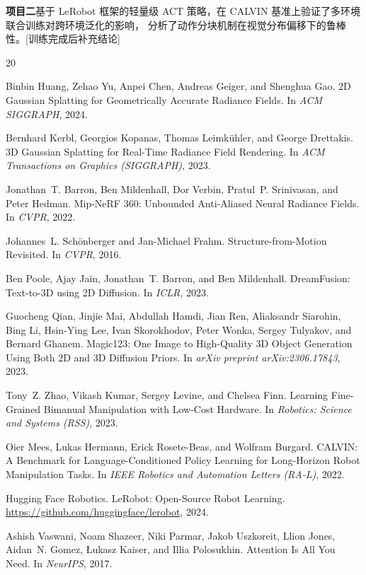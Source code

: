 \documentclass[12pt,a4paper]{ctexart}
\begin{document}
\textbf{项目二}基于 LeRobot 框架的轻量级 ACT 策略，在 CALVIN 基准上验证了多环境联合训练对跨环境泛化的影响，
分析了动作分块机制在视觉分布偏移下的鲁棒性。[训练完成后补充结论]


\begin{thebibliography}{20}

Binbin Huang, Zehao Yu, Anpei Chen, Andreas Geiger, and Shenghua Gao.
\newblock 2D Gaussian Splatting for Geometrically Accurate Radiance Fields.
\newblock In \emph{ACM SIGGRAPH}, 2024.

Bernhard Kerbl, Georgios Kopanas, Thomas Leimk\"uhler, and George Drettakis.
\newblock 3D Gaussian Splatting for Real-Time Radiance Field Rendering.
\newblock In \emph{ACM Transactions on Graphics (SIGGRAPH)}, 2023.

Jonathan~T. Barron, Ben Mildenhall, Dor Verbin, Pratul~P. Srinivasan, and Peter Hedman.
\newblock Mip-NeRF 360: Unbounded Anti-Aliased Neural Radiance Fields.
\newblock In \emph{CVPR}, 2022.

Johannes~L. Sch\"onberger and Jan-Michael Frahm.
\newblock Structure-from-Motion Revisited.
\newblock In \emph{CVPR}, 2016.

Ben Poole, Ajay Jain, Jonathan~T. Barron, and Ben Mildenhall.
\newblock DreamFusion: Text-to-3D using 2D Diffusion.
\newblock In \emph{ICLR}, 2023.

Guocheng Qian, Jinjie Mai, Abdullah Hamdi, Jian Ren, Aliaksandr Siarohin, Bing Li,
  Hsin-Ying Lee, Ivan Skorokhodov, Peter Wonka, Sergey Tulyakov, and Bernard Ghanem.
\newblock Magic123: One Image to High-Quality 3D Object Generation Using Both 2D and 3D Diffusion Priors.
\newblock In \emph{arXiv preprint arXiv:2306.17843}, 2023.

Tony~Z. Zhao, Vikash Kumar, Sergey Levine, and Chelsea Finn.
\newblock Learning Fine-Grained Bimanual Manipulation with Low-Cost Hardware.
\newblock In \emph{Robotics: Science and Systems (RSS)}, 2023.

Oier Mees, Lukas Hermann, Erick Rosete-Beas, and Wolfram Burgard.
\newblock CALVIN: A Benchmark for Language-Conditioned Policy Learning for Long-Horizon Robot Manipulation Tasks.
\newblock In \emph{IEEE Robotics and Automation Letters (RA-L)}, 2022.

Hugging Face Robotics.
\newblock LeRobot: Open-Source Robot Learning.
\newblock \url{https://github.com/huggingface/lerobot}, 2024.

Ashish Vaswani, Noam Shazeer, Niki Parmar, Jakob Uszkoreit, Llion Jones,
  Aidan~N. Gomez, {\L}ukasz Kaiser, and Illia Polosukhin.
\newblock Attention Is All You Need.
\newblock In \emph{NeurIPS}, 2017.

\end{thebibliography}
\end{document}
